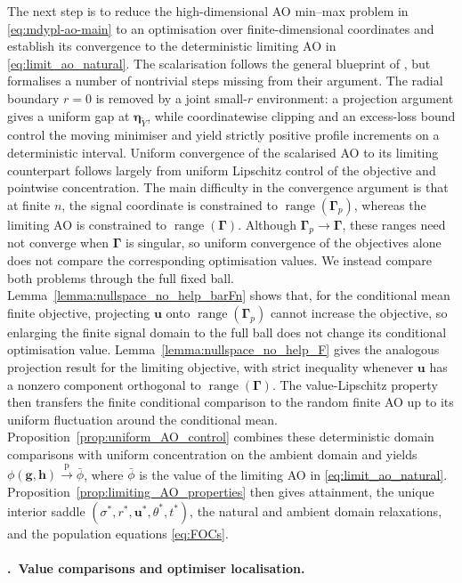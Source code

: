 \documentclass{article}
\makeatletter
\theoremstyle{definition}
\renewcommand{\theparagraph}{\thesubsection.\arabic{paragraph}}
\newcommand{\proofstrategyparagraph}[2]{%
		\refstepcounter{paragraph}%
		\def\@currentlabelname{#1}%
		\label{#2}%
		\paragraph*{\theparagraph\ #1.}%
}
\newcommand*{\bb}{\boldsymbol}
\def\bu{\bb{u}}
\def\bh{\bb{h}}
\def\bg{\bb{g}}
\def\Ytil{\widetilde{Y}}
\def\bEtaYtil{\bb{\eta}_{\Ytil}}
\newcommand{\range}{\operatorname{range}}
\makeatother
\begin{document}
\begin{bibunit}
The next step is to reduce the high-dimensional AO min--max problem in
\eqref{eq:mdypl-ao-main} to an optimisation over finite-dimensional
coordinates and establish its convergence to the deterministic limiting AO
in \eqref{eq:limit_ao_natural}. The scalarisation follows the general
blueprint of \citet{salehi+et+al:2019}, but formalises a number of
nontrivial steps missing from their argument. The radial boundary $r=0$ is
removed by a joint small-$r$ environment: a projection argument gives a
uniform gap at $\bEtaYtil$, while coordinatewise clipping and an excess-loss
bound control the moving minimiser and yield strictly positive profile
increments on a deterministic interval. Uniform convergence of the
scalarised AO to its limiting counterpart follows largely from uniform
Lipschitz control of the objective and pointwise concentration.
The main difficulty in the convergence argument is that at finite $n$, the signal
coordinate is constrained to $\range(\bb\Gamma_p)$, whereas the limiting AO
is constrained to $\range(\bb\Gamma)$. Although
$\bb\Gamma_p\to\bb\Gamma$, these ranges need not converge when
$\bb\Gamma$ is singular, so uniform convergence of the objectives alone does
not compare the corresponding optimisation values.
We instead compare both problems through the full fixed ball.
Lemma~\ref{lemma:nullspace_no_help_barFn} shows that, for the conditional mean
finite objective, projecting $\bu$ onto $\range(\bb\Gamma_p)$ cannot
increase the objective, so enlarging the finite signal domain to the full
ball does not change its conditional optimisation value.
Lemma~\ref{lemma:nullspace_no_help_F} gives the analogous projection result for
the limiting objective, with strict inequality whenever $\bu$ has a
nonzero component orthogonal to $\range(\bb\Gamma)$.
The value-Lipschitz property then transfers the finite conditional
comparison to the random finite AO up to its uniform fluctuation around the
conditional mean.
Proposition~\ref{prop:uniform_AO_control} combines these
deterministic domain comparisons with uniform concentration on the
ambient domain and yields
$
    \phi(\bg,\bh)
    \overset{\mathrm p}{\longrightarrow}
    \bar\phi
$, 
where $\bar\phi$ is the value of the limiting AO in
\eqref{eq:limit_ao_natural}. 
Proposition~\ref{prop:limiting_AO_properties} then gives attainment, the
unique interior saddle
$(\sigma^*,r^*,\bu^*,\theta^*,t^*)$, the natural and ambient domain
relaxations, and the population equations \eqref{eq:FOCs}.


\proofstrategyparagraph{Value comparisons and optimiser localisation}
{par:proof-strategy-localisation}


\end{bibunit}
\end{document}
